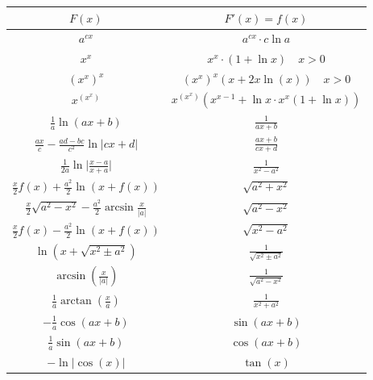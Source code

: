 \documentclass[a4paper,8pt]{extarticle}
\begin{document}
\begin{center}
        \begin{tabular}{|c|c|}
          \hline
                $F(x)$ & $F'(x) = f(x)$ \\
                \hline \hline

	       
                $ a^{cx} $ & $ a^{cx} \cdot c \ln a $ \\
                \hline
                $ x^x $ & $ x^x \cdot (1+\ln x) \quad \scriptstyle x > 0 $ \\
                \hline
                $ (x^x)^x $ & $ (x^x)^x(x+2x\ln(x)) \quad \scriptstyle x > 0 $ \\
                \hline
                $ x^{(x^x)} $ & $ x^{(x^x)}(x^{x-1}+\ln x \cdot x^x (1+\ln x)) $ \\
                \hline
                $ \frac{1}{a} \ln (ax+b) $  &  $ \frac{1}{ax+b}$ \\
                \hline
                $ \frac{ax}{c}-\frac{ad-bc}{c^2} \ln |cx+d| $  &  $ \frac{ax+b}{cx+d} $ \\
                \hline
                $ \frac{1}{2a} \ln { \big| \frac{x-a}{x+a} \big| } $  &  $ \frac{1}{x^2-a^2} $ \\
                \hline
                $ \frac{x}{2} f(x) + \frac{a^2}{2} \ln ( x+f(x) ) $  &  $ \sqrt{a^2+x^2} $ \\
                \hline
                $ \frac{x}{2} \sqrt{a^2-x^2} - \frac{a^2}{2} \arcsin \frac{x}{|a|} $  &  $ \sqrt{a^2-x^2} $ \\
                \hline
                $ \frac{x}{2} f(x) - \frac{a^2}{2} \ln {( x+f(x) )} $  &  $ \sqrt{x^2-a^2} $ \\
                \hline
                $ \ln(x+\sqrt{x^2 \pm a^2}) $  &  $ \frac{1}{\sqrt{x^2 \pm  a^2}} $ \\
                \hline
                $ \arcsin( \frac{x}{|a|}) $  &  $ \frac{1}{\sqrt{a^2-x^2}} $ \\
                \hline
                $ \frac{1}{a} \arctan(\frac{x}{a}) $  &  $ \frac{1}{x^2+a^2} $ \\
                \hline
                $ -\frac{1}{a}\cos(ax+b) $  &  $ \sin(ax+b) $ \\
                \hline
                $ \frac{1}{a}\sin(ax+b) $  &  $ \cos(ax+b) $ \\
                \hline
                $ -\ln|\cos(x)| $  &  $ \tan(x) $ \\
                \hline

\end{tabular}
\end{center}
\end{document}
